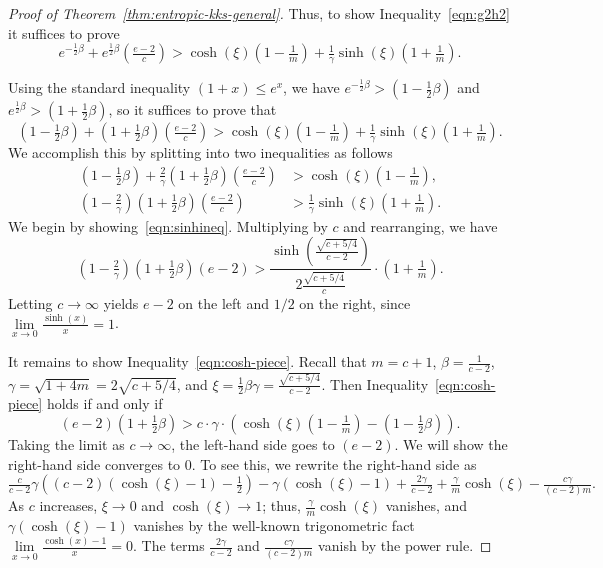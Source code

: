 \begin{proof}[Proof of Theorem~\ref{thm:entropic-kks-general}]
    Thus, to show Inequality~\eqref{eqn:g2h2} it suffices to prove
    \[
        e^{-\tfrac{1}{2}\beta} + e^{\tfrac{1}{2}\beta}(\tfrac{e-2}{c})
        > \cosh(\xi)(1-\tfrac{1}{m}) + \tfrac{1}{\gamma} \sinh(\xi) (1+\tfrac{1}{m}).
    \]

    Using the standard inequality $(1+x) \leq e^{x}$, we have $e^{-\tfrac{1}{2}\beta} > (1 - \tfrac{1}{2}\beta)$ and $e^{\tfrac{1}{2}\beta} >  (1 + \tfrac{1}{2}\beta)$, so it suffices to prove that
    \[
        (1 - \tfrac{1}{2}\beta) + (1 + \tfrac{1}{2}\beta) (\tfrac{e-2}{c})
        > \cosh(\xi)(1-\tfrac{1}{m}) + \tfrac{1}{\gamma} \sinh(\xi) (1+\tfrac{1}{m}).
    \]
    We accomplish this by splitting into two inequalities as follows
    \begin{align}
        (1 - \tfrac{1}{2}\beta) + \tfrac{2}{\gamma}(1+\tfrac{1}{2}\beta)(\tfrac{e-2}{c})
        &> \cosh(\xi)(1-\tfrac{1}{m}), \label{eqn:cosh-piece} \\
        (1-\tfrac{2}{\gamma})(1+\tfrac{1}{2}\beta)(\tfrac{e-2}{c})
        &> \tfrac{1}{\gamma}\sinh(\xi)(1+\tfrac{1}{m})\label{eqn:sinhineq}.
    \end{align}
    We begin by showing~\eqref{eqn:sinhineq}.
    Multiplying by $c$ and rearranging, we have
    \[
    (1-\tfrac{2}{\gamma})(1+\tfrac{1}{2}\beta)(e-2)
    > \frac{\sinh\left(\tfrac{\sqrt{c+5/4}}{c-2}\right)}{ 2 \tfrac{\sqrt{c+5/4}}{c} } \cdot (1+\tfrac{1}{m}).
    \]
    Letting $c\rightarrow \infty$ yields $e-2$ on the left and $1/2$ on the right, since $\lim\limits_{x\rightarrow 0} \tfrac{\sinh(x)}{x} = 1$.

    It remains to show Inequality~\eqref{eqn:cosh-piece}. Recall that
    $m =  c+1$,
    $\beta = \tfrac{1}{c-2}$,
    $\gamma = \sqrt{1 + 4m} = 2 \sqrt{c + 5/4}$,
        and $\xi = \tfrac{1}{2} \beta \gamma = \tfrac{\sqrt{c+5/4}}{c-2}$.
    Then Inequality~\eqref{eqn:cosh-piece} holds if and only if
    \[
         (e-2)(1+\tfrac{1}{2}\beta)
        >
        c\cdot\gamma\cdot \left( \cosh(\xi)(1-\tfrac{1}{m}) - (1 - \tfrac{1}{2}\beta) \right).
    \]
    Taking the limit as $c\rightarrow \infty$, the left-hand side goes to $(e-2)$.
    We will show the right-hand side converges to 0.
    To see this, we rewrite the right-hand side as
    \[
        \tfrac{c}{c-2} \gamma \left( (c-2)(\cosh(\xi)-1)  - \tfrac{1}{2} \right)
        - \gamma(\cosh(\xi) - 1) + \tfrac{2\gamma}{c-2} + \tfrac{\gamma}{m} \cosh(\xi) - \tfrac{c\gamma}{(c-2)m}.
    \]
  As $c$ increases, $\xi \rightarrow 0$ and $\cosh(\xi) \rightarrow 1$;
  thus, $\tfrac{\gamma}{m} \cosh(\xi)$ vanishes, and $\gamma(\cosh(\xi) - 1)$ vanishes by the well-known trigonometric fact $\lim\limits_{x\rightarrow 0} \tfrac{\cosh(x)-1}{x} = 0$.
  The terms $\tfrac{2\gamma}{c-2}$ and $\tfrac{c\gamma}{(c-2)m}$ vanish by the power rule.


\end{proof}
